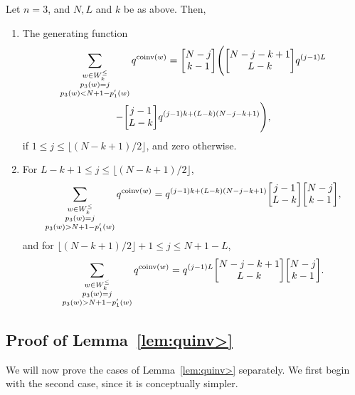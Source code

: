 \documentclass[ALCO,Unicode]{cedram}
\DeclareMathOperator{\coinv}{coinv}
\newcommand{\qbinom}[2]{\bgroup\renewcommand*{\arraystretch}{1}\begin{bmatrix} #1 \\ #2\end{bmatrix} \egroup}
\begin{document}
\begin{lemma}
\label{lem:quinv<}
Let $n=3$, and $N, L$ and $k$ be as above. Then, 
\begin{enumerate}[label=(\arabic*)]
\item \label{it4vvt1}
The generating function
\begin{multline}
\label{quinv<l}
\sum_{\substack{ w \in W_k^\leq \\ p_3(w) = j \\ p_3(w) < N+1 - p'_1(w)}} q^{\coinv(w)} 
= \qbinom{N-j}{k-1} \Bigg( \qbinom {N-j-k+1}{L-k} q^{(j-1)L} \\
  - \qbinom{j-1}{L-k} q^{(j-1)k + (L-k)(N-j-k+1)} \Bigg),
\end{multline}
if $1 \leq j \leq \lfloor (N-k+1)/2 \rfloor$, and zero otherwise.

\item \label{it4vvt2}
For $L-k+1 \leq j \leq \lfloor (N-k+1)/2 \rfloor$,
\begin{equation}
\label{quinv<r1}
\sum_{\substack{ w \in W_k^\leq \\ p_3(w) = j \\ p_3(w) > N+1 - p'_1(w)}} q^{\coinv(w)} = q^{(j-1)k + (L-k)(N-j-k+1)}
\qbinom{j-1}{L-k} \qbinom{N-j}{k-1},
\end{equation}
and for $\lfloor (N-k+1)/2 \rfloor + 1 \leq j \leq N +1 - L$,
\begin{equation}
\label{quinv<r2}
\sum_{\substack{ w \in W_k^\leq \\ p_3(w) = j \\ p_3(w) > N+1 - p'_1(w)}} q^{\coinv(w)} = q^{ (j-1) L} 
\qbinom{N-j-k+1}{L-k} \qbinom {N-j}{k-1}.
\end{equation}
\end{enumerate}
\end{lemma}



\subsection{Proof of Lemma~\ref{lem:quinv>}}
We will now prove the cases of Lemma~\ref{lem:quinv>} separately.
We first begin with the second case, since it is conceptually simpler.
\end{document}
